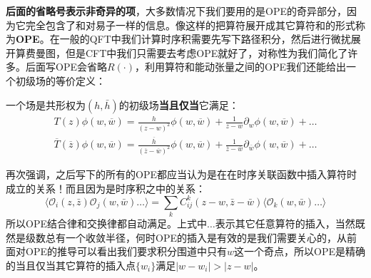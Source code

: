 \textbf{后面的省略号表示非奇异的项}，大多数情况下我们要用的是OPE的奇异部分，因为它完全包含了和对易子一样的信息。像这样的把算符展开成其它算符和的形式称为\textbf{OPE}。在一般的QFT中我们计算时序积需要先写下路径积分，然后进行微扰展开算费曼图，但是CFT中我们只需要去考虑OPE就好了，对称性为我们简化了许多。后面写OPE会省略$R(\cdot)$，利用算符和能动张量之间的OPE我们还能给出一个初级场的等价定义：
\begin{theorem}
	一个场是共形权为$(h,\bar h)$的初级场\textbf{当且仅当}它满足：
	\begin{equation}\label{31.14}
		\boxed{\begin{gathered}
				T(z)\phi(w,\overline{w}) =\frac{h}{(z-w)^{2}}\phi(w,\overline{w})+\frac{1}{z-w}\partial_{w}\phi(w,\overline{w})+\ldots  \\
				\overline{T}(\overline{z})\phi(w,\overline{w}) =\frac{\overline{h}}{(\overline{z}-\overline{w})^{2}}\phi(w,\overline{w})+\frac{1}{\overline{z}-\overline{w}}\partial_{\overline{w}}\phi(w,\overline{w})+\ldots  
		\end{gathered}}
	\end{equation}
\end{theorem}
再次强调，之后写下的所有的OPE都应当认为是在在时序关联函数中插入算符时成立的关系！而且因为是时序积之中的关系：
\begin{equation}
	\langle\mathcal{O}_i(z,\bar{z})\mathcal{O}_j(w,\bar{w})\ldots\rangle=\sum_kC_{ij}^k(z-w,\bar{z}-\bar{w})\langle\mathcal{O}_k(w,\bar{w})\ldots\rangle 
\end{equation}
所以OPE结合律和交换律都自动满足。上式中$\ldots$表示其它任意算符的插入，当然既然是级数总有一个收敛半径，何时OPE的插入是有效的是我们需要关心的，从前面对OPE的推导可以看出我们要求积分围道中只有$w$这一个奇点，所以OPE是精确的当且仅当其它算符的插入点$\{w_i\}$满足$|w-w_i|>|z-w|$。

